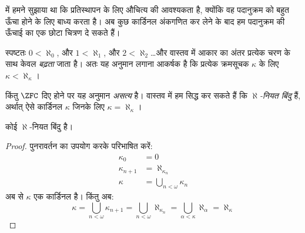 \documentclass[../../../include/open-logic-section]{subfiles}
\begin{document}

 में हमने सुझाया था कि प्रतिस्थापन के लिए औचित्य की
आवश्यकता है, क्योंकि वह पदानुक्रम को बहुत ऊँचा होने के लिए बाध्य करता है।
अब कुछ कार्डिनल अंकगणित कर लेने के बाद हम पदानुक्रम की ऊँचाई का एक छोटा
चित्रण दे सकते हैं।

स्पष्टतः $0<\aleph_0$, और $1<\aleph_1$, और $2<\aleph_2$\ldots और वास्तव
में आकार का अंतर प्रत्येक चरण के साथ केवल \emph{बढ़ता} जाता है। अतः यह
अनुमान लगाना आकर्षक है कि प्रत्येक क्रमसूचक $\kappa$ के लिए
$\kappa<\aleph_\kappa$।

किंतु $\ZFC$ दिए होने पर यह अनुमान \emph{असत्य} है। वास्तव में हम सिद्ध कर
सकते हैं कि \emph{$\aleph$-नियत बिंदु} हैं, अर्थात् ऐसे कार्डिनल $\kappa$
जिनके लिए $\kappa=\aleph_\kappa$।

\begin{prop}
कोई $\aleph$-नियत बिंदु है।
\end{prop}

\begin{proof}
पुनरावर्तन का उपयोग करके परिभाषित करें:
\begin{align*}
	\kappa_0 &= 0\\
	\kappa_{n+1} &= \aleph_{\kappa_n}\\
	\kappa&= \bigcup_{n < \omega}\kappa_n
\end{align*}
अब  से $\kappa$ एक
कार्डिनल है। किंतु अब:
\[
	\kappa= \bigcup_{n < \omega} \kappa_{n+1} = 
	\bigcup_{n < \omega}\aleph_{\kappa_n} = 
	\bigcup_{\alpha < \kappa}\aleph_\alpha = \aleph_\kappa
\]
\end{proof}
\end{document}
